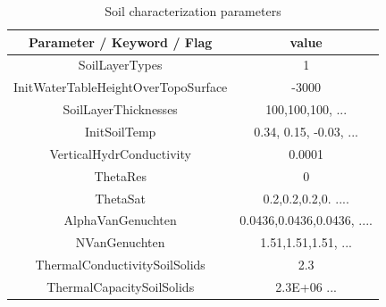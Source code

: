 \vspace{-1.5cm}
\begin{table}[h!]
\begin{center}
\begin{tabular}[c]{|c|c|}
\hline
Parameter / Keyword / Flag & value\\
\hline
SoilLayerTypes & 1 \\
InitWaterTableHeightOverTopoSurface & -3000 \\
SoilLayerThicknesses &100,100,100, ... \\
InitSoilTemp & 0.34, 0.15, -0.03, ... \\
VerticalHydrConductivity & 0.0001 \\
ThetaRes & 0 \\
ThetaSat & 0.2,0.2,0.2,0. .... \\
AlphaVanGenuchten & 0.0436,0.0436,0.0436, .... \\
NVanGenuchten & 1.51,1.51,1.51, ... \\
ThermalConductivitySoilSolids & 2.3 \\
ThermalCapacitySoilSolids & 2.3E+06 ... \\
\hline
\end{tabular}
\caption{Soil   characterization parameters}
\label{tab:soilPar}
\end{center}
\end{table}
